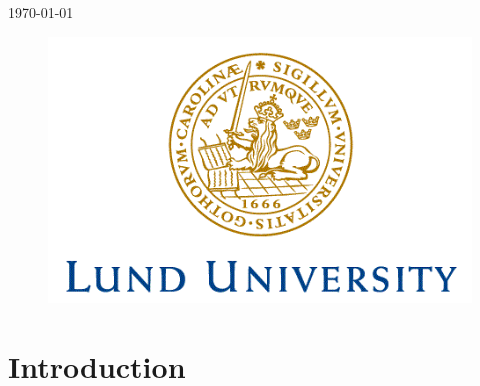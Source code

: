 \documentclass[11pt,a4paper]{article}
\begin{document}
\begin{titlepage}


{\large \today}\\[2cm] %


\begin{figure}[!h]
\centering
\includegraphics[scale=0.6]{Logo.png}
\end{figure} %
 

\vfill %



\end{titlepage}


\newpage
\tableofcontents
\thispagestyle{empty}
\newpage

\section{Introduction}
\end{document}
